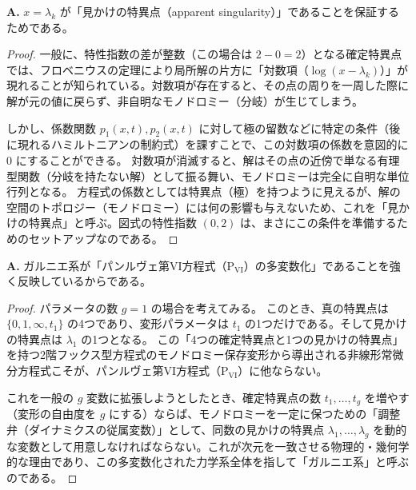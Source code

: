 \begin{Q}[【核心】リーマン図式 \eqref{eq:3.65} において、$x=\lambda_k$ の特性指数が $(0, 2)$ となっているのは、解析的にどのような要請によるものか？]
\textbf{A.} $x=\lambda_k$ が「見かけの特異点（apparent singularity）」であることを保証するためである。

\begin{proof}
一般に、特性指数の差が整数（この場合は $2 - 0 = 2$）となる確定特異点では、フロベニウスの定理により局所解の片方に「対数項（$\log(x-\lambda_k)$）」が現れることが知られている。対数項が存在すると、その点の周りを一周した際に解が元の値に戻らず、非自明なモノドロミー（分岐）が生じてしまう。

しかし、係数関数 $p_1(x,t), p_2(x,t)$ に対して極の留数などに特定の条件（後に現れるハミルトニアンの制約式）を課すことで、この対数項の係数を意図的に $0$ にすることができる。
対数項が消滅すると、解はその点の近傍で単なる有理型関数（分岐を持たない解）として振る舞い、モノドロミーは完全に自明な単位行列となる。
方程式の係数としては特異点（極）を持つように見えるが、解の空間のトポロジー（モノドロミー）には何の影響も与えないため、これを「見かけの特異点」と呼ぶ。図式の特性指数 $(0, 2)$ は、まさにこの条件を準備するためのセットアップなのである。
\end{proof}
\end{Q}

\begin{Q}[【大局観】なぜ「見かけの特異点の個数」と「変形パラメータの次元」を同じ $g$ に揃える（$L=g$ とする）必然性があるのか？]
\textbf{A.} ガルニエ系が「パンルヴェ第VI方程式（$\mathrm{P_{VI}}$）の多変数化」であることを強く反映しているからである。

\begin{proof}
パラメータの数 $g=1$ の場合を考えてみる。
このとき、真の特異点は $\{0, 1, \infty, t_1\}$ の4つであり、変形パラメータは $t_1$ の1つだけである。そして見かけの特異点は $\lambda_1$ の1つとなる。
この「4つの確定特異点と1つの見かけの特異点」を持つ2階フックス型方程式のモノドロミー保存変形から導出される非線形常微分方程式こそが、パンルヴェ第VI方程式（$\mathrm{P_{VI}}$）に他ならない。

これを一般の $g$ 変数に拡張しようとしたとき、確定特異点の数 $t_1, \dots, t_g$ を増やす（変形の自由度を $g$ にする）ならば、モノドロミーを一定に保つための「調整弁（ダイナミクスの従属変数）」として、同数の見かけの特異点 $\lambda_1, \dots, \lambda_g$ を動的な変数として用意しなければならない。これが次元を一致させる物理的・幾何学的な理由であり、この多変数化された力学系全体を指して「ガルニエ系」と呼ぶのである。
\end{proof}
\end{Q}

